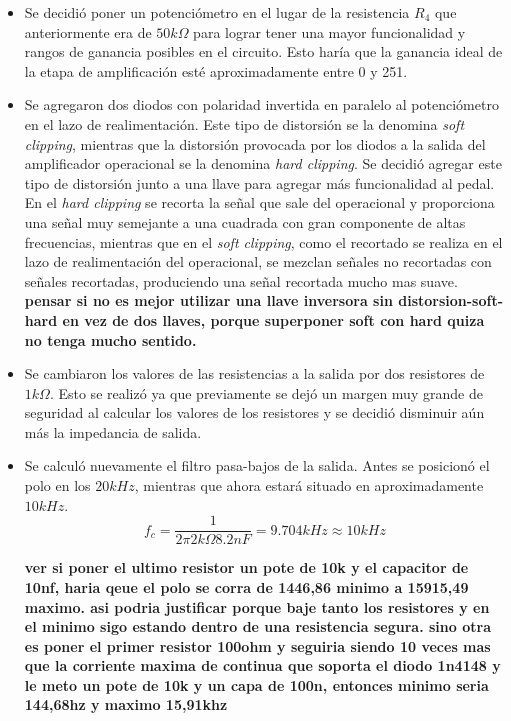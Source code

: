 \begin{itemize}
\item Se decidió poner un potenciómetro en el lugar de la resistencia $R_4$ que anteriormente era de $50k\Omega$ para lograr tener una mayor funcionalidad y rangos de ganancia posibles en el circuito. Esto haría que la ganancia ideal de la etapa de amplificación esté aproximadamente entre 0 y 251. 
\item Se agregaron dos diodos con polaridad invertida en paralelo al potenciómetro en el lazo de realimentación. Este tipo de distorsión se la denomina \textit{soft clipping}, mientras que la distorsión provocada por los diodos a la salida del amplificador operacional se la denomina \textit{hard clipping}. Se decidió agregar este tipo de distorsión junto a una llave para agregar más funcionalidad al pedal. En el \textit{hard clipping} se recorta la señal que sale del operacional y proporciona una señal muy semejante a una cuadrada con gran componente de altas frecuencias, mientras que en el \textit{soft clipping}, como el recortado se realiza en el lazo de realimentación del operacional, se mezclan señales no recortadas con señales recortadas, produciendo una señal recortada mucho mas suave.
\textbf{pensar si no es mejor utilizar una llave inversora sin distorsion-soft-hard en vez de dos llaves, porque superponer soft con hard quiza no tenga mucho sentido.}
\item Se cambiaron los valores de las resistencias a la salida por dos resistores de $1k\Omega$. Esto se realizó ya que previamente se dejó un margen muy grande de seguridad al calcular los valores de los resistores y se decidió disminuir aún más la impedancia de salida. 
\item Se calculó nuevamente el filtro pasa-bajos de la salida. Antes se posicionó el polo en los $20kHz$, mientras que ahora estará situado en  aproximadamente $10kHz$. $$ f_c = \frac{1}{2\pi 2k\Omega 8.2nF} = 9.704kHz \approx 10kHz$$

\textbf{ver si poner el ultimo resistor un pote de 10k y el capacitor de 10nf, haria qeue el polo se corra de 1446,86 minimo a 15915,49 maximo. asi podria justificar porque baje tanto los resistores y en el minimo sigo estando dentro de una resistencia segura. sino otra es poner el primer resistor 100ohm y seguiria siendo 10 veces mas que la corriente maxima de continua que soporta el diodo 1n4148 y le meto un pote de 10k y un capa de 100n, entonces minimo seria 144,68hz y maximo 15,91khz}

\end{itemize}


